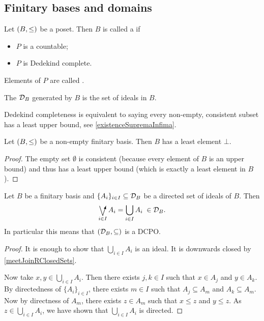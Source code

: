 \subsection{Finitary bases and domains}
\begin{definition}
Let $\sSet{B,\leq}$ be a poset. Then $B$ is called a  if
\begin{itemize}
\item $P$ is a countable;
\item $P$ is Dedekind complete.
\end{itemize}
Elements of $P$ are called .

The  $\mathcal{D}_B$ generated by $B$ is the set of ideals in $B$.
\end{definition}
Dedekind completeness is equivalent to saying every non-empty, consistent subset has a least upper bound, see \ref{existenceSupremaInfima}.

\begin{lemma}
Let $\sSet{B,\leq}$ be a non-empty finitary basis. Then $B$ has a least element $\bot$.
\end{lemma}
\begin{proof}
The empty set $\emptyset$ is consistent (because every element of $B$ is an upper bound) and thus has a least upper bound (which is exactly a least element in $B$).
\end{proof}

\begin{proposition} \label{directedJoinDomain}
Let $B$ be a finitary basis and $\{A_i\}_{i\in I} \subseteq \mathcal{D}_B$ be a directed set of ideals of $B$. Then
\[ \dirvee_{i\in I} A_i = \bigcup_{i\in I}A_i \;\in \domain_B. \]
In particular this means that $\sSet{\domain_B, \subseteq}$ is a DCPO.
\end{proposition}
\begin{proof}
It is enough to show that $\bigcup_{i\in I}A_i$ is an ideal. It is downwards closed by \ref{meetJoinRClosedSets}.

Now take $x,y\in \bigcup_{i\in I}A_i$. Then there exists $j,k\in I$ such that $x\in A_j$ and $y\in A_k$. By directedness of $\{A_i\}_{i\in I}$, there exists $m\in I$ such that $A_j\subseteq A_m$ and $A_k \subseteq A_m$. Now by directness of $A_m$, there exists $z\in A_m$ such that $x\leq z$ and $y\leq z$. As $z\in \bigcup_{i\in I}A_i$, we have shown that $\bigcup_{i\in I}A_i$ is directed.
\end{proof}

